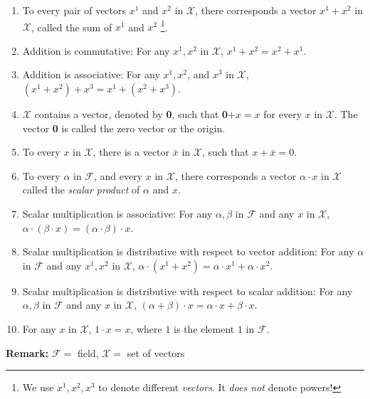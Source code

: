 \documentclass[letterpaper]{article}
\begin{document}
    \begin{enumerate}
        \item To every pair of vectors $x^1$ and $x^2$ in $\mathcal{X}$, there corresponds a vector $x^1+x^2$ in $\mathcal{X}$, called the sum of $x^1$ and $x^2$ \footnote{We use $x^1, x^2, x^3$ to denote different \emph{vectors}. It \emph{does not} denote powers!}.
        \item Addition is commutative: For any $x^1,x^2$ in $\mathcal{X}$, $x^1+x^2 = x^2+x^1$.
        \item Addition is associative: For any $x^1,x^2$, and $x^3$ in $\mathcal{X}$, $\left(x^1+x^2\right)+x^3 = x^1 + \left(x^2+x^3\right)$.
        \item $\mathcal{X}$ contains a vector, denoted by \textbf{0}, such that \textbf{0}$ + x = x$ for every $x$ in $\mathcal{X}$. The vector \textbf{0} is called the zero vector or the origin.
        \item To every $x$ in $\mathcal{X}$, there is a vector $\bar x$ in $\mathcal{X}$, such that $x + \bar x = 0$.
        \item To every $\alpha$ in $\mathcal{F}$, and every $x$ in $\mathcal{X}$, there corresponds a vector $\alpha\cdot x$ in $\mathcal{X}$ called the \textit{scalar product} of $\alpha$ and $x$.
        \item Scalar multiplication is associative: For any $\alpha, \beta$ in $\mathcal{F}$ and any $x$ in $\mathcal{X}$, $\alpha\cdot\left(\beta\cdot x\right) = \left(\alpha\cdot\beta\right)\cdot x$.
        \item Scalar multiplication is distributive with respect to vector addition: For any $\alpha$ in $\mathcal{F}$ and any $x^1,x^2$ in $\mathcal{X}$, $\alpha\cdot\left(x^1+x^2\right) = \alpha\cdot x^1 + \alpha\cdot x^2$.
        \item Scalar multiplication is distributive with respect to scalar addition: For any $\alpha ,\beta$ in $\mathcal{F}$ and any $x$ in $\mathcal{X}$, $\left(\alpha+\beta\right)\cdot x = \alpha\cdot x + \beta\cdot x$.
        \item For any $x$ in $\mathcal{X}$, $1\cdot x=x$, where $1$ is the element $1$ in $\mathcal{F}$.
    \end{enumerate}

\noindent \textbf{Remark:} $\mathcal{F} = $ field, $\mathcal{X} = $ set of vectors
\end{document}
